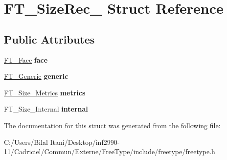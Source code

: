 \hypertarget{struct_f_t___size_rec__}{}\section{F\+T\+\_\+\+Size\+Rec\+\_\+ Struct Reference}
\label{struct_f_t___size_rec__}
\subsection*{Public Attributes}
\begin{DoxyCompactItemize}
\item 
\hyperlink{struct_f_t___face_rec__}{F\+T\+\_\+\+Face} {\bfseries face}\hypertarget{struct_f_t___size_rec___a21b54fb07feaba8be23321054da98f5f}{}\label{struct_f_t___size_rec___a21b54fb07feaba8be23321054da98f5f}

\item 
\hyperlink{struct_f_t___generic__}{F\+T\+\_\+\+Generic} {\bfseries generic}\hypertarget{struct_f_t___size_rec___aa24520b093a9b4ba9ff388bfe7b9491d}{}\label{struct_f_t___size_rec___aa24520b093a9b4ba9ff388bfe7b9491d}

\item 
\hyperlink{struct_f_t___size___metrics__}{F\+T\+\_\+\+Size\+\_\+\+Metrics} {\bfseries metrics}\hypertarget{struct_f_t___size_rec___a29a6b518d09f6cf1714d9aed01eddc01}{}\label{struct_f_t___size_rec___a29a6b518d09f6cf1714d9aed01eddc01}

\item 
F\+T\+\_\+\+Size\+\_\+\+Internal {\bfseries internal}\hypertarget{struct_f_t___size_rec___a236c47ea3138e485c29b0d7baa5cf3b6}{}\label{struct_f_t___size_rec___a236c47ea3138e485c29b0d7baa5cf3b6}

\end{DoxyCompactItemize}


The documentation for this struct was generated from the following file\+:\begin{DoxyCompactItemize}
\item 
C\+:/\+Users/\+Bilal Itani/\+Desktop/inf2990-\/11/\+Cadriciel/\+Commun/\+Externe/\+Free\+Type/include/freetype/freetype.\+h\end{DoxyCompactItemize}
